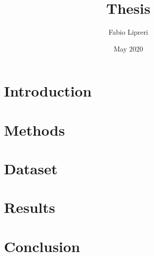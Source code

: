 \documentclass{report}
\title{Thesis}
\author{Fabio Lipreri}
\date{May 2020}
\begin{document}
\maketitle

\tableofcontents{}

\chapter{Introduction}


\chapter{Methods}


\chapter{Dataset}


\chapter{Results}


\chapter{Conclusion}



\printbibliography
\end{document}
